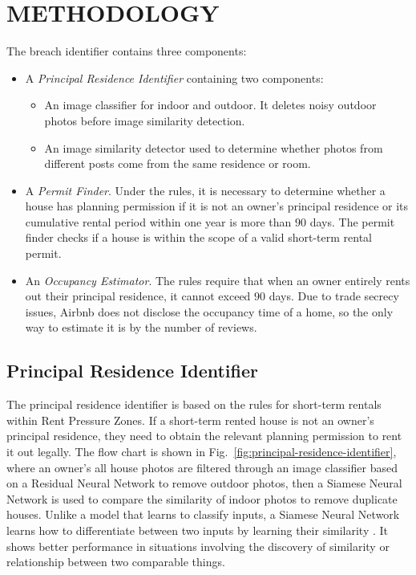 \documentclass[conference, compsoc]{IEEEtran}
\begin{document}
\section{METHODOLOGY}
The breach identifier contains three components:
\begin{itemize}
    \item
    A \emph{Principal Residence Identifier} containing two components:
    \begin{itemize}
        \item
        An image classifier for indoor and outdoor.
        It deletes noisy outdoor photos before image similarity detection.
        \item
        An image similarity detector used to determine whether photos from different posts come from the same residence or room.
    \end{itemize}

    \item
    A \emph{Permit Finder}.
    Under the rules, it is necessary to determine whether a house has planning permission if it is not an owner's principal residence or its cumulative rental period within one year is more than $90$ days.
    The permit finder checks if a house is within the scope of a valid short-term rental permit.

    \item
    An \emph{Occupancy Estimator}.
    The rules require that when an owner entirely rents out their principal residence, it cannot exceed $90$ days.
    Due to trade secrecy issues, Airbnb does not disclose the occupancy time of a home, so the only way to estimate it is by the number of reviews.
\end{itemize}

\subsection{Principal Residence Identifier}
The principal residence identifier is based on the rules for short-term rentals within Rent Pressure Zones.
If a short-term rented house is not an owner's principal residence, they need to obtain the relevant planning permission to rent it out legally.
The flow chart is shown in Fig.~\ref{fig:principal-residence-identifier}, where an owner's all house photos are filtered through an image classifier based on a Residual Neural Network to remove outdoor photos,
then a Siamese Neural Network is used to compare the similarity of indoor photos to remove duplicate houses.
Unlike a model that learns to classify inputs, a Siamese Neural Network learns how to differentiate between two inputs by learning their similarity \cite{siamese-neural-network}.
It shows better performance in situations involving the discovery of similarity or relationship between two comparable things.
\end{document}
